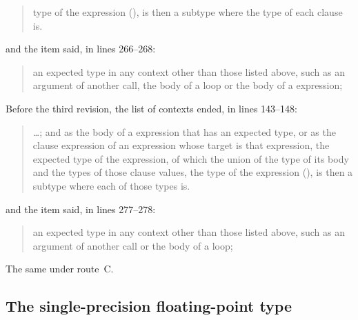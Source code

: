 \begin{description}
\begin{quote}
type of the  expression (), is then a subtype
where the type of each clause is.
\end{quote}
and the item said, in lines 266--268:
\begin{quote}
an expected type in any context other than those listed above, such as
an argument of another call, the body of a  loop or the body of a
 expression;
\end{quote}
Before the third revision, the list of contexts ended, in lines 143--148:
\begin{quote}
\ldots; and as the body of a  expression that has an expected
type, or as the  clause expression of an  expression whose
target is that  expression, the expected type of the 
expression, of which the union of the type of its body and the types of those
 clause values, the type of the  expression
(), is then a subtype where each of those types is.
\end{quote}
and the item said, in lines 277--278:
\begin{quote}
an expected type in any context other than those listed above, such as
an argument of another call or the body of a  loop;
\end{quote}
\item[Route C] The same under route~C.
\end{description}

\subsection{The single-precision floating-point type}

